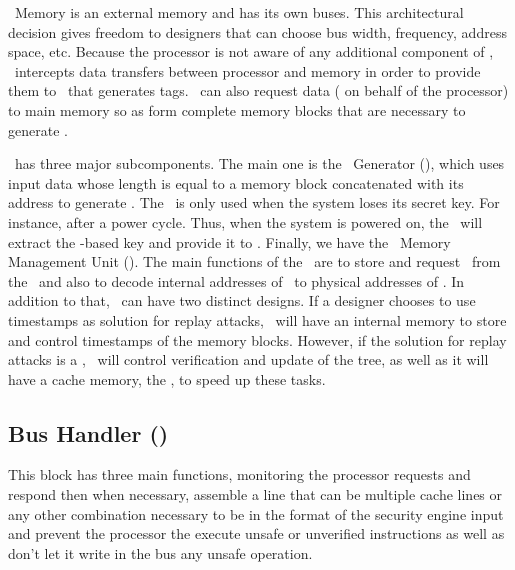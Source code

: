 \ptag~Memory is an external memory and has its own buses. This architectural decision gives freedom to designers that can choose bus width, frequency, address space, etc. Because the processor is not aware of any additional component of \cshia, \handler~intercepts data transfers between processor and memory in order to provide them to \seceng~that generates tags. \handler~can also request data ( on behalf of the processor) to main memory so as  form complete memory blocks that are necessary to generate \ptags.

\seceng~has three major subcomponents. The main one is the \ptag~Generator (\ptaggen), which uses input data whose length is equal to a memory block concatenated with its address to generate \ptags. The \fuzzy~is only used when the system loses its secret key. For instance, after a power cycle. Thus, when the system is powered on, the \fuzzy~will extract the \puf-based key and provide it to \ptaggen. Finally, we have the \ptag~Memory Management Unit (\pmmu). The main functions of the \pmmu~are to store and request \ptags~from the \ptagmem~and also to decode internal addresses of \ptags~to physical addresses of \ptagmem. In addition to that, \pmmu~can have two distinct designs. If a designer chooses to use timestamps as solution for replay attacks, \pmmu~will have an internal memory to store and control timestamps of the memory blocks. However, if the solution for replay attacks is a \mt\cite{FINDAREFERENCE}, \pmmu~will control verification and update of the tree, as well as it will have a cache memory, the \ptagcache, to speed up these tasks.






\subsection{Bus Handler (\handler)}
This block has three main functions, monitoring the processor requests and respond then when necessary, 
assemble a line %
that can be multiple cache lines or any other combination necessary to be in the format
 of the security engine input  and prevent the processor the execute unsafe or unverified instructions
 as well as don't let  it  write in the bus any unsafe operation.
